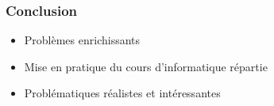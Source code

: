 

\begin{frame}
	\frametitle{Conclusion}
	\begin{itemize}
		\item Problèmes enrichissants 
		\item Mise en pratique du cours d'informatique répartie
		\item Problématiques réalistes et intéressantes
	\end{itemize}
\end{frame}